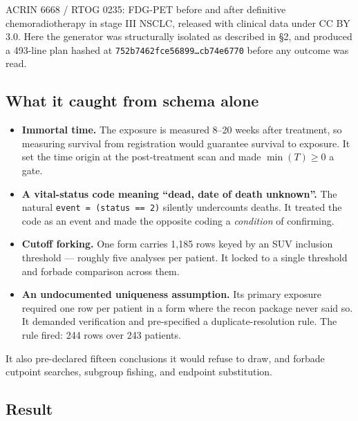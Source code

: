 \documentclass[11pt,a4paper]{article}
\begin{document}
ACRIN 6668 / RTOG 0235: FDG-PET before and after definitive chemoradiotherapy in stage III NSCLC,
released with clinical data under CC BY 3.0. Here the generator was structurally isolated as
described in \S2, and produced a 493-line plan hashed at
\texttt{752b7462fce56899\ldots cb74e6770} before any outcome was read.

\subsection{What it caught from schema alone}

\begin{itemize}[leftmargin=1.3em,itemsep=2pt]
\item \textbf{Immortal time.} The exposure is measured 8--20 weeks after treatment, so measuring
      survival from registration would guarantee survival to exposure. It set the time origin at
      the post-treatment scan and made $\min(T)\geq 0$ a gate.
\item \textbf{A vital-status code meaning ``dead, date of death unknown''.} The natural
      \texttt{event = (status == 2)} silently undercounts deaths. It treated the code as an event
      and made the opposite coding a \emph{condition} of confirming.
\item \textbf{Cutoff forking.} One form carries 1{,}185 rows keyed by an SUV inclusion threshold ---
      roughly five analyses per patient. It locked to a single threshold and forbade comparison
      across them.
\item \textbf{An undocumented uniqueness assumption.} Its primary exposure required one row per
      patient in a form where the recon package never said so. It demanded verification and
      pre-specified a duplicate-resolution rule. The rule fired: 244 rows over 243 patients.
\end{itemize}

It also pre-declared fifteen conclusions it would refuse to draw, and forbade cutpoint searches,
subgroup fishing, and endpoint substitution.

\subsection{Result}
\end{document}
